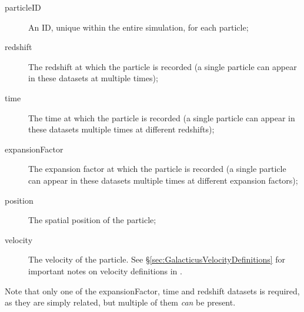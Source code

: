 \begin{description}
 \item [{\normalfont \ttfamily particleID}] An ID, unique within the entire simulation, for each particle;
 \item [{\normalfont \ttfamily redshift}] The redshift at which the particle is recorded (a single particle can appear in these datasets at multiple times);
 \item [{\normalfont \ttfamily time}] The time at which the particle is recorded (a single particle can appear in these datasets multiple times at different redshifts);
 \item [{\normalfont \ttfamily expansionFactor}] The expansion factor at which the particle is recorded (a single particle can appear in these datasets multiple times at different expansion factors);
 \item [{\normalfont \ttfamily position}] The spatial position of the particle;
 \item [{\normalfont \ttfamily velocity}] The velocity of the particle. See \S\ref{sec:GalacticusVelocityDefinitions} for important notes on velocity definitions in \glc.
\end{description}

Note that only one of the {\normalfont \ttfamily expansionFactor}, {\normalfont \ttfamily time} and {\normalfont \ttfamily redshift} datasets is required, as they are simply related, but multiple of them \emph{can} be present.
